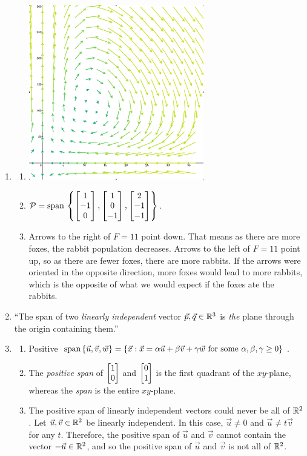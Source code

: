 		\begin{enumerate}
			\item \begin{enumerate}
				\item \phantom{x}
				
				\includegraphics[width=3in]{resources/tutorial-02-1a.png}
					\item $\mathcal P=\mathrm{span}\,\left\{\begin{bmatrix}1\\-1\\0\end{bmatrix},\begin{bmatrix}1\\0\\-1\end{bmatrix}, \begin{bmatrix}2\\-1\\-1\end{bmatrix}\right\}$.

				\item Arrows to the right of $F=11$ point down. That means as there are more foxes, the rabbit population decreases.
				Arrows to the left of $F=11$ point up, so as there are fewer foxes, there are more rabbits. If the arrows were oriented in the opposite direction,
				more foxes would lead to more rabbits, which is the opposite of what we would expect if the foxes ate the rabbits.
			\end{enumerate}
			\item ``The span of two \emph{linearly independent} vector $\vec p,\vec q\in \mathbb{R}^3$ is \emph{the} plane through
				the origin containing them.''
			\item \begin{enumerate}
				\item Positive $\mathrm{span}\,\{\vec u,\vec v,\vec w\}=\{\vec x:\vec x=\alpha\vec u+\beta\vec v+\gamma \vec w\text{ for some }\alpha,\beta,\gamma\geq 0\}$.
				\item The \emph{positive span} of $\begin{bmatrix}1\\0\end{bmatrix}$ and $\begin{bmatrix}0\\1\end{bmatrix}$ is the first quadrant of the $xy$-plane, whereas
					the \emph{span} is the entire $xy$-plane.
				\item The positive span of linearly independent vectors could never be all of $\mathbb{R}^2$.
					Let $\vec u,\vec v\in \mathbb{R}^2$ be linearly independent.
					In this case, $\vec u\neq 0$ and $\vec u\neq t\vec v$ for any $t$.
					Therefore, the positive span of $\vec u$ and $\vec v$ cannot contain the vector $-\vec u\in \mathbb{R}^2$,
					and so the positive span of $\vec u$ and $\vec v$ is not all of $\mathbb{R}^2$.


\end{enumerate}
\end{enumerate}
